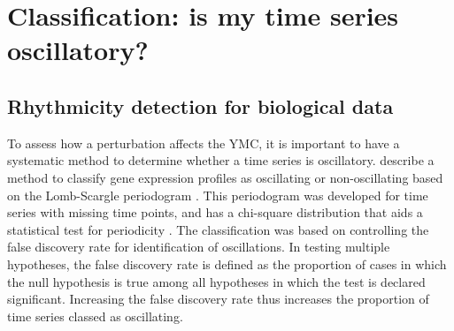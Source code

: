 \section{Classification: is my time series oscillatory?}
\label{sec:analysis-classification}

\subsection{Rhythmicity detection for biological data}
\label{subsec:analysis-classification-rhythmicity}



To assess how a perturbation affects the YMC, it is important to have a systematic method to determine whether a time series is oscillatory.
\citet{glynnDetectingPeriodicPatterns2006} describe a method to classify gene expression profiles as oscillating or non-oscillating based on the Lomb-Scargle periodogram \citep{lombLeastsquaresFrequencyAnalysis1976}.
This periodogram was developed for time series with missing time points, and has a chi-square distribution that aids a statistical test for periodicity \citep{scargleStudiesAstronomicalTime1982}.
The classification was based on controlling the false discovery rate for identification of oscillations.
In testing multiple hypotheses, the false discovery rate is defined as the proportion of cases in which the null hypothesis is true among all hypotheses in which the test is declared significant.
Increasing the false discovery rate thus increases the proportion of time series classed as oscillating.

